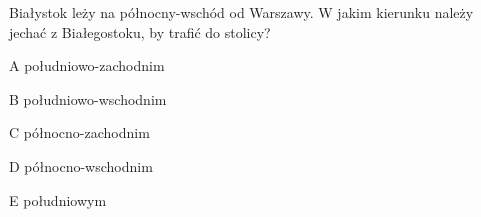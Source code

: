 \begin{tresc}
Białystok leży na północny-wschód od Warszawy. W jakim kierunku należy jechać z Białegostoku, by trafić do stolicy?
\end{tresc}
\begin{wariant}{A} południowo-zachodnim \end{wariant}
\begin{wariant}{B} południowo-wschodnim \end{wariant}
\begin{wariant}{C} północno-zachodnim \end{wariant}
\begin{wariant}{D} północno-wschodnim \end{wariant}
\begin{wariant}{E} południowym \end{wariant}
